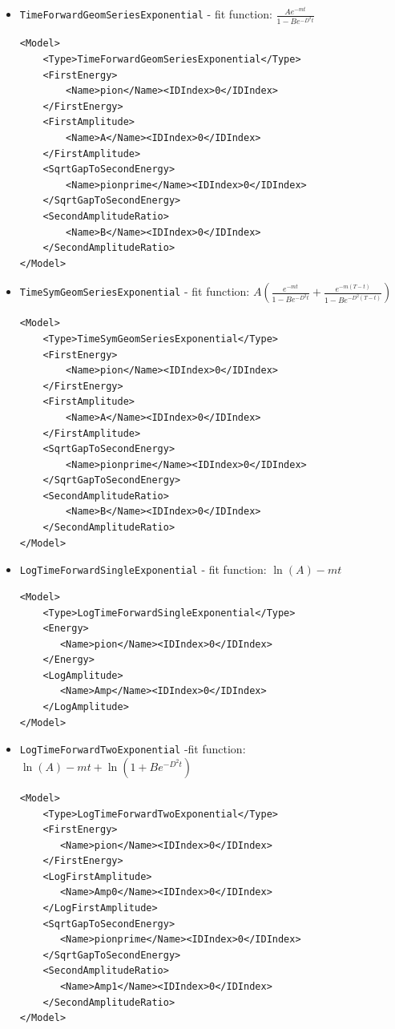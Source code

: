 \documentclass[12pt]{article}
\newcommand{\vb}{\texttt}
\begin{document}
\begin{itemize}
\item \vb{TimeForwardGeomSeriesExponential} - fit function:
  $\frac{Ae^{-mt}}{1 - B e^{-D^2t}}$
\begin{verbatim}
<Model>
    <Type>TimeForwardGeomSeriesExponential</Type>
    <FirstEnergy>
        <Name>pion</Name><IDIndex>0</IDIndex>
    </FirstEnergy>
    <FirstAmplitude>
        <Name>A</Name><IDIndex>0</IDIndex>
    </FirstAmplitude>
    <SqrtGapToSecondEnergy>
        <Name>pionprime</Name><IDIndex>0</IDIndex>
    </SqrtGapToSecondEnergy>
    <SecondAmplitudeRatio>
        <Name>B</Name><IDIndex>0</IDIndex>
    </SecondAmplitudeRatio>
</Model>
\end{verbatim}

\item \vb{TimeSymGeomSeriesExponential} - fit function:
  $A\left(\frac{e^{-mt}}{1 - B e^{-D^2t}} + \frac{e^{-m(T-t)}}{1 - B e^{-D^2(T-t)}} \right)$
\begin{verbatim}
<Model>
    <Type>TimeSymGeomSeriesExponential</Type>
    <FirstEnergy>
        <Name>pion</Name><IDIndex>0</IDIndex>
    </FirstEnergy>
    <FirstAmplitude>
        <Name>A</Name><IDIndex>0</IDIndex>
    </FirstAmplitude>
    <SqrtGapToSecondEnergy>
        <Name>pionprime</Name><IDIndex>0</IDIndex>
    </SqrtGapToSecondEnergy>
    <SecondAmplitudeRatio>
        <Name>B</Name><IDIndex>0</IDIndex>
    </SecondAmplitudeRatio>
</Model>
\end{verbatim}

\item \vb{LogTimeForwardSingleExponential} - fit function:
          $\ln(A) - m t$
\begin{verbatim}
<Model>
    <Type>LogTimeForwardSingleExponential</Type>          
    <Energy>
       <Name>pion</Name><IDIndex>0</IDIndex>
    </Energy>
    <LogAmplitude>
       <Name>Amp</Name><IDIndex>0</IDIndex>
    </LogAmplitude>
</Model>
\end{verbatim}

\item \vb{LogTimeForwardTwoExponential} -fit function:
   $ \ln(A) - mt + \ln(1 + B e^{-D^2 t} ) $
\begin{verbatim}
<Model>
    <Type>LogTimeForwardTwoExponential</Type>
    <FirstEnergy>
       <Name>pion</Name><IDIndex>0</IDIndex>
    </FirstEnergy>
    <LogFirstAmplitude>
       <Name>Amp0</Name><IDIndex>0</IDIndex>
    </LogFirstAmplitude>
    <SqrtGapToSecondEnergy>
       <Name>pionprime</Name><IDIndex>0</IDIndex>
    </SqrtGapToSecondEnergy>
    <SecondAmplitudeRatio>
       <Name>Amp1</Name><IDIndex>0</IDIndex>
    </SecondAmplitudeRatio>
</Model>
\end{verbatim}
\end{itemize}
\end{document}
